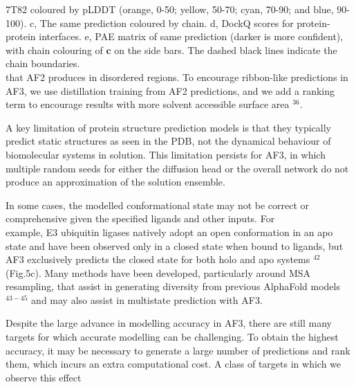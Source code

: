 \documentclass[10pt]{article}
\begin{document}
7T82 coloured by pLDDT (orange, 0-50; yellow, 50-70; cyan, 70-90; and blue, 90-100). c, The same prediction coloured by chain. d, DockQ scores for protein-protein interfaces. e, PAE matrix of same prediction (darker is more confident), with chain colouring of $\mathbf{c}$ on the side bars. The dashed black lines indicate the chain boundaries.\\
that AF2 produces in disordered regions. To encourage ribbon-like predictions in AF3, we use distillation training from AF2 predictions, and we add a ranking term to encourage results with more solvent accessible surface area ${ }^{36}$.

A key limitation of protein structure prediction models is that they typically predict static structures as seen in the PDB, not the dynamical behaviour of biomolecular systems in solution. This limitation persists for AF3, in which multiple random seeds for either the diffusion head or the overall network do not produce an approximation of the solution ensemble.

In some cases, the modelled conformational state may not be correct or comprehensive given the specified ligands and other inputs. For\\
example, E3 ubiquitin ligases natively adopt an open conformation in an apo state and have been observed only in a closed state when bound to ligands, but AF3 exclusively predicts the closed state for both holo and apo systems ${ }^{42}$ (Fig.5c). Many methods have been developed, particularly around MSA resampling, that assist in generating diversity from previous AlphaFold models ${ }^{43-45}$ and may also assist in multistate prediction with AF3.

Despite the large advance in modelling accuracy in AF3, there are still many targets for which accurate modelling can be challenging. To obtain the highest accuracy, it may be necessary to generate a large number of predictions and rank them, which incurs an extra computational cost. A class of targets in which we observe this effect
\end{document}
